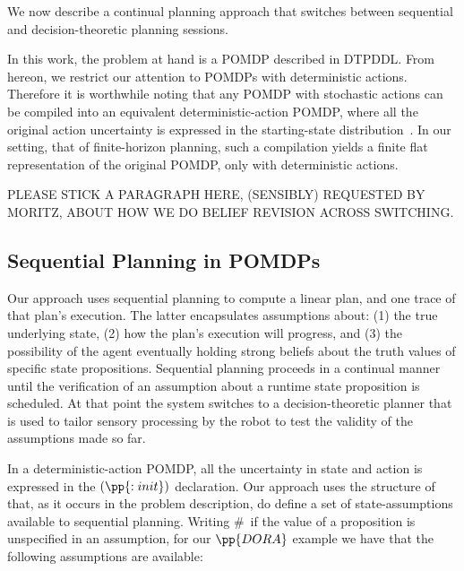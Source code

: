 

We now describe a continual planning approach that switches between
sequential and decision-theoretic planning sessions. 


In this work, the problem at hand is a POMDP described in DTPDDL. From
hereon, we restrict our attention to POMDPs with deterministic
actions. Therefore it is worthwhile noting that any POMDP with
stochastic actions can be compiled into an equivalent
deterministic-action POMDP, where all the original action uncertainty
is expressed in the starting-state
distribution~\cite{ng:Jordan:2000}. In our setting, that of
finite-horizon planning, such a compilation yields a finite flat
representation of the original POMDP, only with deterministic
actions. 


PLEASE STICK A PARAGRAPH HERE, (SENSIBLY) REQUESTED BY MORITZ, ABOUT
HOW WE DO BELIEF REVISION ACROSS SWITCHING.


\subsection{Sequential Planning in POMDPs}


Our approach uses sequential planning to compute a linear plan, and
one trace of that plan's execution. The latter encapsulates
assumptions about: (1) the true underlying state, (2) how the plan's
execution will progress, and (3) the possibility of the agent
eventually holding strong beliefs about the truth values of specific
state propositions. Sequential planning proceeds in a continual manner
until the verification of an assumption about a runtime state
proposition is scheduled. At that point the system switches to a
decision-theoretic planner that is used to tailor sensory processing
by the robot to test the validity of the assumptions made so far.

In a deterministic-action POMDP, all the uncertainty in state and
action is expressed in the $(\pp{:init})$ declaration. Our approach
uses the structure of that, as it occurs in the problem description,
do define a set of state-assumptions available to sequential planning.
Writing \#\ if the value of a proposition is unspecified in an
assumption, for our $\pp{DORA}$ example we have that the following
assumptions are available:


